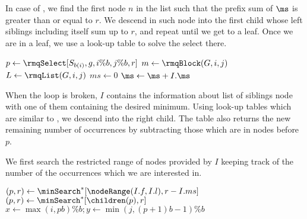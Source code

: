 In case of \rmqSelect{}, we find the first node $n$ in the list such that the prefix sum of $\ms$ is greater than or equal to $r$.
We descend in such node into the first child whose left siblings including itself sum up to $r$, and repeat until we get to a leaf.
Once we are in a leaf, we use a look-up table to solve the select there.

\begin{algorithmic}
 
		\State $p \gets \rmqSelect[S_{b(i)}, g, i \% b, j \% b, r]$
		\State {}
	\Else
		\State $m \gets \rmqBlock(G, i, j)$
		\State $L \gets \rmqList(G, i, j)$
		\State $ms \gets 0$
					\State \Break
				\EndIf
				\State $\ms \gets \ms + I.\ms$
			\EndIf
		\EndFor
{}
\end{algorithmic}

When the loop is broken, $I$ contains the information about list of siblings node with one of them containing the desired minimum.
Using look-up tables which are similar to \nodeSearch{}, we descend into the right child.
The table also returns the new remaining number of occurrences by subtracting those which are in nodes before $p$.

We first search the restricted range of nodes provided by $I$ keeping track of the number of the occurrences which we are interested in.

\begin{algorithmic}
		\State $(p, r) \gets \minSearch^*[\nodeRange(I.f, I.l), r - I.ms]$
			\State $(p, r) \gets \minSearch^*[\children(p), r]$
		\EndWhile
		\State $x \gets \max(i, p b) \% b; y \gets \min(j, (p + 1) b - 1) \% b$
		\State {}
	\EndIf
\EndFunction
\end{algorithmic}

